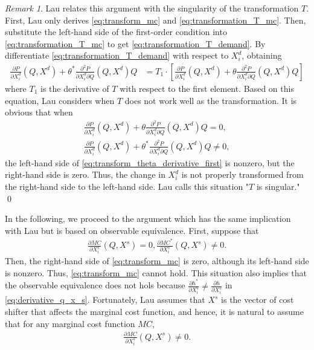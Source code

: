 \documentclass[11pt, a4paper]{article}
\theoremstyle{remark}
\newtheorem{remark}{Remark}
\begin{document}
\begin{remark}
Lau relates this argument with the singularity of the transformation $T$.
First, Lau only derives \eqref{eq:transform_mc} and \eqref{eq:transformation_T_mc}.
Then, substitute the left-hand side of the first-order condition into \eqref{eq:transformation_T_mc} to get \eqref{eq:transformation_T_demand}.
By differentiate \eqref{eq:transformation_T_demand} with respect to $X^{d}_i$, obtaining
\begin{align}
\frac{\partial P}{\partial X^{d}_i}(Q, X^{d}) + \theta^{*}\frac{\partial^2 P}{\partial X^{d}_i \partial Q}(Q, X^{d})Q &= T_{1} \cdot \left[\frac{\partial P}{\partial X^{d}_i}(Q, X^{d}) + \theta \frac{\partial^2 P}{\partial X^{d}_i \partial Q}(Q, X^{d})Q\right]\label{eq:transform_theta_derivative_first}
\end{align}
where $T_1$ is the derivative of $T$ with respect to the first element.
Based on this equation, Lau considers when $T$ does not work well as the transformation.
It is obvious that when 
\begin{align}
    \frac{\partial P}{\partial X^{d}_{i}}(Q, X^{d}) + \theta \frac{\partial^2 P}{\partial X^{d}_{i}\partial Q}(Q, X^{d})Q = 0,\\
    \frac{\partial P}{\partial X^{d}_{i}}(Q, X^{d}) + \theta^{*} \frac{\partial^2 P}{\partial X^{d}_{i}\partial Q}(Q, X^{d})Q \ne 0,
\end{align}
the left-hand side of \eqref{eq:transform_theta_derivative_first} is nonzero, but the right-hand side is zero.
Thus, the change in $X_{i}^d$ is not properly transformed from the right-hand side to the left-hand side.
Lau calls this situation "$T$ is singular."
\qed
\end{remark}



In the following, we proceed to the argument which has the same implication with Lau but is based on observable equivalence.
First, suppose that
\begin{align}
    \frac{\partial MC}{\partial X_i^{s}}(Q, X^{s}) = 0, \frac{\partial MC^{*}}{\partial X_i^{s}}(Q, X^{s}) \ne 0.
\end{align}
Then, the right-hand side of \eqref{eq:transform_mc} is zero, although its left-hand side is nonzero.
Thus, \eqref{eq:transform_mc} cannot hold.
This situation also implies that the observable equivalence does not hols because $\frac{\partial h^{*}}{\partial X^{s}_{i}}  \ne \frac{\partial h}{\partial X^{s}_{i}}$ in \eqref{eq:derivative_q_x_s}.
Fortunately, Lau assumes that $X^{s}$ is the vector of cost shifter that affects the marginal cost function, and hence, it is natural to assume that for any marginal cost function $MC$, 
\begin{align}
    \frac{\partial MC}{\partial X_i^{s}}(Q, X^{s}) \ne 0.
\end{align}
\end{document}
